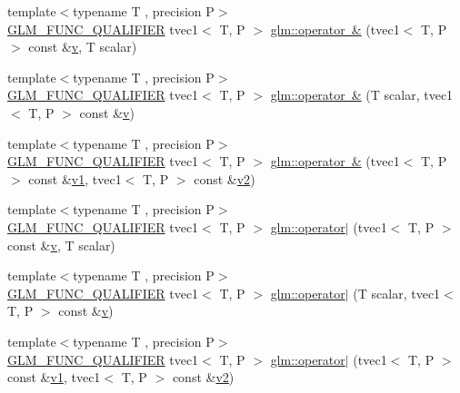 \begin{DoxyCompactItemize}
\item 
{\footnotesize template$<$typename T , precision P$>$ }\\\mbox{\hyperlink{setup_8hpp_a33fdea6f91c5f834105f7415e2a64407}{G\+L\+M\+\_\+\+F\+U\+N\+C\+\_\+\+Q\+U\+A\+L\+I\+F\+I\+ER}} tvec1$<$ T, P $>$ \mbox{\hyperlink{namespaceglm_a591400903377e7a0de39bb29c3e2c136}{glm\+::operator \&}} (tvec1$<$ T, P $>$ const \&\mbox{\hyperlink{glad_8h_a14cfbe2fc2234f5504618905b69d1e06}{v}}, T scalar)
\item 
{\footnotesize template$<$typename T , precision P$>$ }\\\mbox{\hyperlink{setup_8hpp_a33fdea6f91c5f834105f7415e2a64407}{G\+L\+M\+\_\+\+F\+U\+N\+C\+\_\+\+Q\+U\+A\+L\+I\+F\+I\+ER}} tvec1$<$ T, P $>$ \mbox{\hyperlink{namespaceglm_a2cf20136cf10a233dfd85b8c7ecf6986}{glm\+::operator \&}} (T scalar, tvec1$<$ T, P $>$ const \&\mbox{\hyperlink{glad_8h_a14cfbe2fc2234f5504618905b69d1e06}{v}})
\item 
{\footnotesize template$<$typename T , precision P$>$ }\\\mbox{\hyperlink{setup_8hpp_a33fdea6f91c5f834105f7415e2a64407}{G\+L\+M\+\_\+\+F\+U\+N\+C\+\_\+\+Q\+U\+A\+L\+I\+F\+I\+ER}} tvec1$<$ T, P $>$ \mbox{\hyperlink{namespaceglm_af206ce9eb72d18cc54593124b3944218}{glm\+::operator \&}} (tvec1$<$ T, P $>$ const \&\mbox{\hyperlink{glad_8h_a0779c3b73f9aa3a0ac5b0139b5d291d9}{v1}}, tvec1$<$ T, P $>$ const \&\mbox{\hyperlink{glad_8h_a9a09a1837922b2b806f4589096a52049}{v2}})
\item 
{\footnotesize template$<$typename T , precision P$>$ }\\\mbox{\hyperlink{setup_8hpp_a33fdea6f91c5f834105f7415e2a64407}{G\+L\+M\+\_\+\+F\+U\+N\+C\+\_\+\+Q\+U\+A\+L\+I\+F\+I\+ER}} tvec1$<$ T, P $>$ \mbox{\hyperlink{namespaceglm_a48ab816265c765be1feda2afff6276ee}{glm\+::operator$\vert$}} (tvec1$<$ T, P $>$ const \&\mbox{\hyperlink{glad_8h_a14cfbe2fc2234f5504618905b69d1e06}{v}}, T scalar)
\item 
{\footnotesize template$<$typename T , precision P$>$ }\\\mbox{\hyperlink{setup_8hpp_a33fdea6f91c5f834105f7415e2a64407}{G\+L\+M\+\_\+\+F\+U\+N\+C\+\_\+\+Q\+U\+A\+L\+I\+F\+I\+ER}} tvec1$<$ T, P $>$ \mbox{\hyperlink{namespaceglm_ae51e45f5dc9f6799b17e67715a0d632b}{glm\+::operator$\vert$}} (T scalar, tvec1$<$ T, P $>$ const \&\mbox{\hyperlink{glad_8h_a14cfbe2fc2234f5504618905b69d1e06}{v}})
\item 
{\footnotesize template$<$typename T , precision P$>$ }\\\mbox{\hyperlink{setup_8hpp_a33fdea6f91c5f834105f7415e2a64407}{G\+L\+M\+\_\+\+F\+U\+N\+C\+\_\+\+Q\+U\+A\+L\+I\+F\+I\+ER}} tvec1$<$ T, P $>$ \mbox{\hyperlink{namespaceglm_a4f13423d9e8ce29a4ff6569e689e442f}{glm\+::operator$\vert$}} (tvec1$<$ T, P $>$ const \&\mbox{\hyperlink{glad_8h_a0779c3b73f9aa3a0ac5b0139b5d291d9}{v1}}, tvec1$<$ T, P $>$ const \&\mbox{\hyperlink{glad_8h_a9a09a1837922b2b806f4589096a52049}{v2}})

\end{DoxyCompactItemize}

